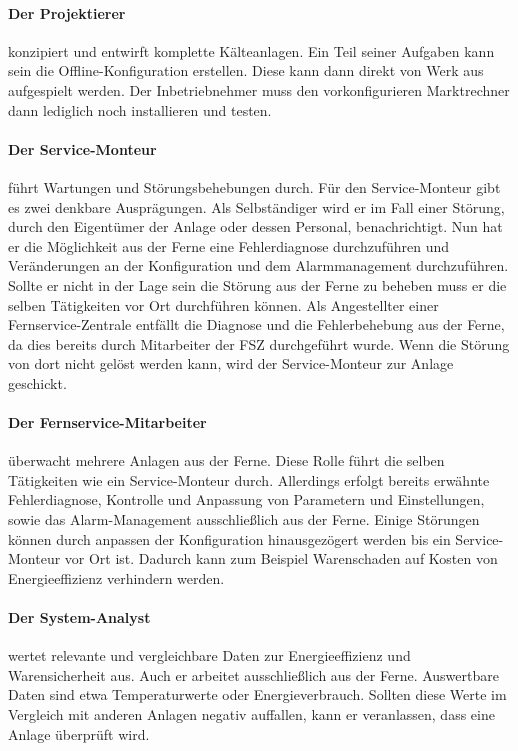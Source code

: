 \documentclass[11pt,a4paper]{report}
\begin{document}
\paragraph{Der Projektierer} konzipiert und entwirft komplette Kälteanlagen. Ein Teil seiner Aufgaben kann sein die Offline-Konfiguration erstellen. Diese kann dann direkt von Werk aus aufgespielt werden. Der Inbetriebnehmer muss den vorkonfigurieren Marktrechner dann lediglich noch installieren und testen.
\paragraph{Der Service-Monteur} führt Wartungen und Störungsbehebungen durch. Für den Service-Monteur gibt es zwei denkbare Ausprägungen. Als Selbständiger wird er im Fall einer Störung, durch den Eigentümer der Anlage oder dessen Personal, benachrichtigt. Nun hat er die Möglichkeit aus der Ferne eine Fehlerdiagnose durchzuführen und Veränderungen an der Konfiguration und dem Alarmmanagement durchzuführen. Sollte er nicht in der Lage sein die Störung aus der Ferne zu beheben muss er die selben Tätigkeiten vor Ort durchführen können. Als Angestellter einer Fernservice-Zentrale entfällt die Diagnose und die Fehlerbehebung aus der Ferne, da dies bereits durch Mitarbeiter der FSZ durchgeführt wurde. Wenn die Störung von dort nicht gelöst werden kann, wird der Service-Monteur zur Anlage geschickt.
\paragraph{Der Fernservice-Mitarbeiter} überwacht mehrere Anlagen aus der Ferne. Diese Rolle führt die selben Tätigkeiten wie ein Service-Monteur durch. Allerdings erfolgt bereits erwähnte Fehlerdiagnose, Kontrolle und Anpassung von Parametern und Einstellungen, sowie das Alarm-Management ausschließlich aus der Ferne. Einige Störungen können durch anpassen der Konfiguration hinausgezögert werden bis ein Service-Monteur vor Ort ist. Dadurch kann zum Beispiel Warenschaden auf Kosten von Energieeffizienz verhindern werden.
\paragraph{Der System-Analyst} wertet relevante und vergleichbare Daten zur Energieeffizienz und Warensicherheit aus. Auch er arbeitet ausschließlich aus der Ferne. Auswertbare Daten sind etwa Temperaturwerte oder Energieverbrauch. Sollten diese Werte im Vergleich mit anderen Anlagen negativ auffallen, kann er veranlassen, dass eine Anlage überprüft wird.
\end{document}
